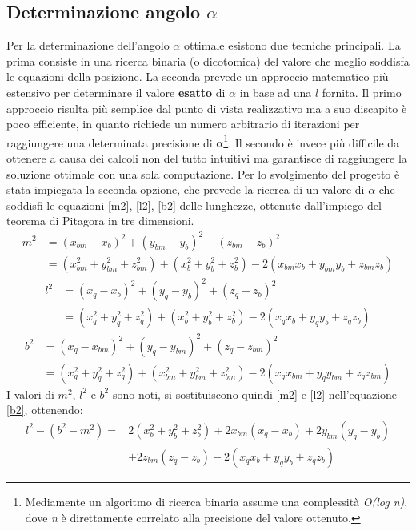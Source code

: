 \documentclass[12pt,twoside,openright]{report}
\begin{document}
\subsection{Determinazione angolo \boldmath$\alpha$}\label{determinazionealfa}
Per la determinazione dell'angolo $\alpha$ ottimale esistono due tecniche principali. La prima consiste in una ricerca binaria (o dicotomica) del valore che meglio soddisfa le equazioni della posizione. La seconda prevede un approccio matematico più estensivo per determinare il valore \textbf{esatto} di $\alpha$ in base ad una $l$ fornita\cite{calcolostewart1}\cite{calcolostewart2}. Il primo approccio risulta più semplice dal punto di vista realizzativo ma a suo discapito è poco efficiente, in quanto richiede un numero arbitrario di iterazioni per raggiungere una determinata precisione di $\alpha$\footnote{Mediamente un algoritmo di ricerca binaria assume una complessità \emph{O(log n)}, dove \emph{n} è direttamente correlato alla precisione del valore ottenuto.}. Il secondo è invece più difficile da ottenere a causa dei calcoli non del tutto intuitivi ma garantisce di raggiungere la soluzione ottimale con una sola computazione. Per lo svolgimento del progetto è stata impiegata la seconda opzione, che prevede la ricerca di un valore di $\alpha$ che soddisfi le equazioni \eqref{m2}, \eqref{l2}, \eqref{b2} delle lunghezze, ottenute dall'impiego del teorema di Pitagora in tre dimensioni.
\begin{align}\label{m2}
    m^2 &= (x_{bm}-x_b)^2+(y_{bm}-y_b)^2+(z_{bm}-z_b)^2\nonumber\\
    		&= (x_{bm}^2+y_{bm}^2+z_{bm}^2)+(x_{b}^2+y_{b}^2+z_{b}^2)-2(x_{bm}x_b+y_{bm}y_b+z_{bm}z_b)
\end{align}
\begin{align}\label{l2}
    l^2 &= (x_{q}-x_b)^2+(y_{q}-y_b)^2+(z_{q}-z_b)^2\nonumber\\
    		&= (x_{q}^2+y_{q}^2+z_{q}^2)+(x_{b}^2+y_{b}^2+z_{b}^2)-2(x_{q}x_b+y_{q}y_b+z_{q}z_b)
\end{align}
\begin{align}\label{b2}
    b^2 &= (x_{q}-x_{bm})^2+(y_{q}-y_{bm})^2+(z_{q}-z_{bm})^2\nonumber\\
    		&= (x_{q}^2+y_{q}^2+z_{q}^2)+(x_{bm}^2+y_{bm}^2+z_{bm}^2)-2(x_{q}x_{bm}+y_{q}y_{bm}+z_{q}z_{bm})
\end{align}
I valori di $m^2$, $l^2$ e $b^2$ sono noti, si sostituiscono quindi \eqref{m2} e \eqref{l2} nell'equazione \eqref{b2}, ottenendo:
\begin{align}\label{passaggio}
    l^2-(b^2-m^2) =& 2(x_{b}^2+y_{b}^2+z_{b}^2)+2x_{bm}(x_q-x_b)+2y_{bm}(y_q-y_b)\nonumber \\&+2z_{bm}(z_q-z_b)-2(x_qx_b+y_qy_b+z_qz_b)
\end{align}
\end{document}
